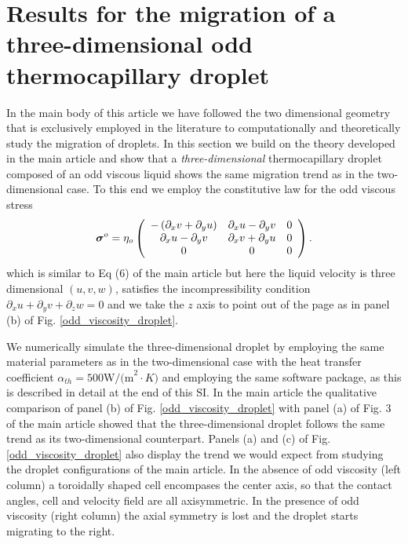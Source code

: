 \documentclass[%
 amsmath,amssymb,
 aps,
10.5pt]{revtex4-2}
\def\bm#1{\mbox{\boldmath{$#1$}}}
\newcommand{\be}{\begin{equation}}
\newcommand{\ee}{\end{equation}}
\begin{document}
\section{Results for the migration of a three-dimensional odd thermocapillary droplet}
{In the main body of this article we have followed the two dimensional geometry that
is exclusively employed in the literature to computationally and theoretically study the migration of droplets. 
In this section we build on the theory developed in the main article 
and show that a \emph{three-dimensional} thermocapillary droplet composed of an odd viscous liquid
shows the same migration trend as in the two-dimensional case. To this end we employ the 
constitutive law \citep[\S13]{Landau1981} for the odd viscous stress
\be \label{sigma1}
\bm{\sigma}^o = \eta_o 
\left(\begin{array}{ccc}
-\left(\partial_x v + \partial_y u \right) &  \partial_x u  - \partial_y v & 0\\
 \partial_x u  - \partial_y v & \partial_x v + \partial_y u   & 0\\
0&0&0
\end{array}
\right).
\ee
which is similar to Eq (6) of the main article but here the liquid velocity is three dimensional
$(u,v,w)$, satisfies the incompressibility condition $\partial_x u + \partial_y v + \partial_zw=0$ and we take the $z$ axis to point out of the page as in panel (b) of Fig. \ref{odd_viscosity_droplet}. 

We numerically simulate the three-dimensional droplet by employing the same material parameters
as in the two-dimensional case with the heat transfer coefficient 
$\alpha_{th} = 500 \textrm{W/(m}^2\cdot K)$ and employing the same software package, as 
this is described in detail at the end of this SI. In the main article the qualitative 
comparison of panel (b) of Fig. \ref{odd_viscosity_droplet} with panel (a) of Fig. 3 of the main article
showed that the three-dimensional droplet follows the same trend as its two-dimensional counterpart.  
Panels (a) and (c) of Fig. \ref{odd_viscosity_droplet} also display the trend we would expect from
studying the droplet configurations of the main article. In the absence of odd viscosity (left column) 
a toroidally shaped cell encompases the center axis, so that the contact angles, cell and velocity field
are all axisymmetric. In the presence of odd viscosity (right column) the axial symmetry is lost and 
the droplet starts migrating to the right. 
}
\end{document}

